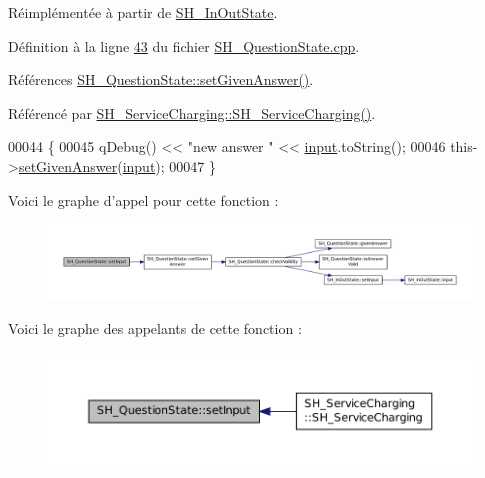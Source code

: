 Réimplémentée à partir de \hyperlink{classSH__InOutState_a0206ab7d5616f28b0da7bfd5451614e8}{S\-H\-\_\-\-In\-Out\-State}.



Définition à la ligne \hyperlink{SH__QuestionState_8cpp_source_l00043}{43} du fichier \hyperlink{SH__QuestionState_8cpp_source}{S\-H\-\_\-\-Question\-State.\-cpp}.



Références \hyperlink{classSH__QuestionState_a9d285a34a7002fd05a7fa8ff9139c264}{S\-H\-\_\-\-Question\-State\-::set\-Given\-Answer()}.



Référencé par \hyperlink{classSH__ServiceCharging_afa5273d046049b1c2b020a6a19a8290b}{S\-H\-\_\-\-Service\-Charging\-::\-S\-H\-\_\-\-Service\-Charging()}.


\begin{DoxyCode}
00044 \{
00045     qDebug() << \textcolor{stringliteral}{"new answer "} << \hyperlink{classSH__InOutState_a04364c76d2fd8a3781e7b325955e5bd9}{input}.toString();
00046     this->\hyperlink{classSH__QuestionState_a9d285a34a7002fd05a7fa8ff9139c264}{setGivenAnswer}(\hyperlink{classSH__InOutState_a04364c76d2fd8a3781e7b325955e5bd9}{input});
00047 \}
\end{DoxyCode}


Voici le graphe d'appel pour cette fonction \-:
\nopagebreak
\begin{figure}[H]
\begin{center}
\leavevmode
\includegraphics[width=350pt]{classSH__QuestionState_a331222d371d9c97392f35c84a5ef43e1_cgraph}
\end{center}
\end{figure}




Voici le graphe des appelants de cette fonction \-:
\nopagebreak
\begin{figure}[H]
\begin{center}
\leavevmode
\includegraphics[width=350pt]{classSH__QuestionState_a331222d371d9c97392f35c84a5ef43e1_icgraph}
\end{center}
\end{figure}


